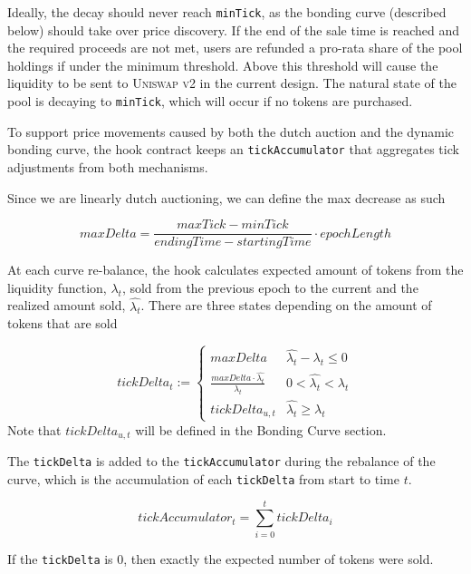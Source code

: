 \documentclass[sigconf,nonacm,prologue,table]{acmart}
\numberwithin{equation}{section}
\theoremstyle{definition}
\theoremstyle{remark}
\begin{document}
Ideally, the decay should never reach \verb|minTick|, as the bonding curve (described below) should take over price discovery. If the end of the sale time is reached and the required proceeds are not met, users are refunded a pro-rata share of the pool holdings if under the minimum threshold. Above this threshold will cause the liquidity to be sent to \textsc{Uniswap v2} in the current design. The natural state of the pool is decaying to \verb|minTick|, which will occur if no tokens are purchased. 

To support price movements caused by both the dutch auction and the dynamic bonding curve, the hook contract keeps an \verb|tickAccumulator| that aggregates tick adjustments from both mechanisms. 

Since we are linearly dutch auctioning, we can define the max decrease as such

\begin{equation}
    maxDelta = \frac{maxTick - minTick}{endingTime - startingTime} \cdot epochLength
\end{equation}

At each curve re-balance, the hook calculates expected amount of tokens from the liquidity function, $\lambda_t$, sold from the previous epoch to the current and the realized amount sold, $\hat{\lambda_t}$. There are three states depending on the amount of tokens that are sold

\begin{equation}
    tickDelta_t := \begin{cases} 
          maxDelta & \hat{\lambda_t} - \lambda_t \leq 0 \\
          \frac{maxDelta \cdot \hat{\lambda_t}}{\lambda_t} & 0 < \hat{\lambda_t} < \lambda_t \\
          tickDelta_{u,t} & \hat{\lambda_t} \geq \lambda_t
       \end{cases} 
\end{equation}
Note that $tickDelta_{u,t}$ will be defined in the Bonding Curve section. 

The \verb|tickDelta| is added to the \verb|tickAccumulator| during the rebalance of the curve, which is the accumulation of each \verb|tickDelta| from start to time $t$.

\begin{equation}
    tickAccumulator_t = \sum^t_{i=0} tickDelta_i 
\end{equation}

If the \verb|tickDelta| is 0, then exactly the expected number of tokens were sold.
\end{document}
